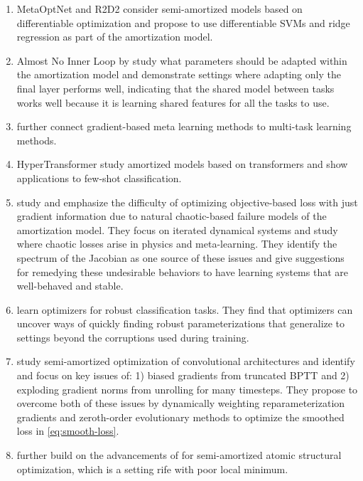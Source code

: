 \documentclass[twoside,11pt]{article}
\begin{document}
\begin{enumerate}
\item MetaOptNet \citep{lee2019meta} and R2D2 \citep{bertinetto2018meta}
  consider semi-amortized models based on differentiable
  optimization and propose to use differentiable SVMs
  and ridge regression as part of the amortization model.
\item Almost No Inner Loop by \citet{raghu2019rapid}
  study what parameters should be adapted within the amortization
  model and demonstrate settings where adapting only
  the final layer performs well, indicating that the shared model
  between tasks works well because it is learning
  shared features for all the tasks to use.
\item \citet{wang2021bridging} further connect gradient-based meta
  learning methods to multi-task learning methods.
\item HyperTransformer \citep{zhmoginov2022hypertransformer}
  study amortized models based on transformers
  \citep{vaswani2017attention}
  and show applications to few-shot classification.
\item \citet{metz2021gradients} study and emphasize the difficulty
  of optimizing objective-based loss with just gradient
  information due to natural chaotic-based failure models
  of the amortization model.
  They focus on iterated dynamical systems and study where
  chaotic losses arise in physics and meta-learning.
  They identify the spectrum of the Jacobian as one
  source of these issues and give suggestions for
  remedying these undesirable behaviors to have learning
  systems that are well-behaved and stable.
\item \citet{metz2019using} learn optimizers for robust
  classification tasks. They find that optimizers can
  uncover ways of quickly finding robust parameterizations
  that generalize to settings beyond the corruptions
  used during training.
\item \citet{metz2019understanding} study semi-amortized
  optimization of convolutional architectures and identify
  and focus on key issues of:
  1) biased gradients from truncated BPTT and 2) exploding gradient
  norms from unrolling for many timesteps.
  They propose to overcome both of these issues by
  dynamically weighting reparameterization
  gradients and zeroth-order evolutionary methods to
  optimize the smoothed loss in \cref{eq:smooth-loss}.
\item \citet{merchant2021learn2hop} further build on
  the advancements of \citet{metz2019understanding} for
  semi-amortized atomic structural optimization, which
  is a setting rife with poor local minimum.

\end{enumerate}
\end{document}
